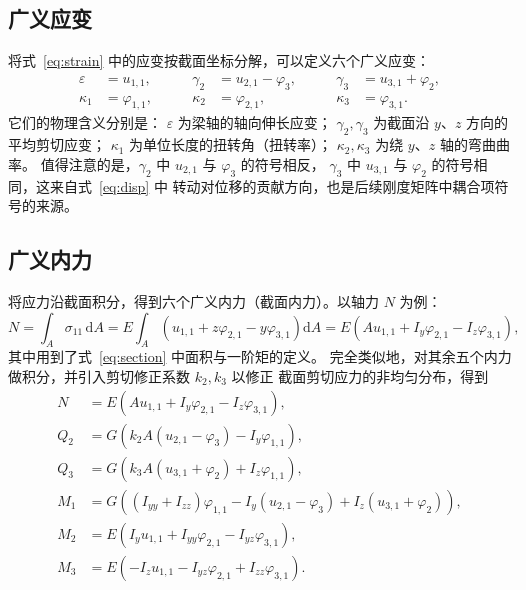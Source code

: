 \documentclass[UTF8,a4paper,11pt]{ctexart}
\newcommand{\ud}{\mathrm{d}}
\begin{document}
\subsection{广义应变}

将式~\eqref{eq:strain} 中的应变按截面坐标分解，可以定义六个广义应变：
\begin{equation}\label{eq:gstrain}
\boxed{
\begin{aligned}
\varepsilon &= u_{1,1}, &\qquad
\gamma_2 &= u_{2,1}-\varphi_3, &\qquad
\gamma_3 &= u_{3,1}+\varphi_2,\\
\kappa_1 &= \varphi_{1,1}, &\qquad
\kappa_2 &= \varphi_{2,1}, &\qquad
\kappa_3 &= \varphi_{3,1}.
\end{aligned}}
\end{equation}
它们的物理含义分别是：
$\varepsilon$ 为梁轴的轴向伸长应变；
$\gamma_2,\gamma_3$ 为截面沿 $y$、$z$ 方向的平均剪切应变；
$\kappa_1$ 为单位长度的扭转角（扭转率）；
$\kappa_2,\kappa_3$ 为绕 $y$、$z$ 轴的弯曲曲率。
值得注意的是，$\gamma_2$ 中 $u_{2,1}$ 与 $\varphi_3$ 的符号相反，
$\gamma_3$ 中 $u_{3,1}$ 与 $\varphi_2$ 的符号相同，这来自式~\eqref{eq:disp} 中
转动对位移的贡献方向，也是后续刚度矩阵中耦合项符号的来源。

\subsection{广义内力}

将应力沿截面积分，得到六个广义内力（截面内力）。以轴力 $N$ 为例：
\begin{equation}
N=\int_A \sigma_{11}\,\ud A
 =E\int_A\left(u_{1,1}+z\varphi_{2,1}-y\varphi_{3,1}\right)\ud A
 =E\left(Au_{1,1}+I_y\varphi_{2,1}-I_z\varphi_{3,1}\right),
\end{equation}
其中用到了式~\eqref{eq:section} 中面积与一阶矩的定义。
完全类似地，对其余五个内力做积分，并引入剪切修正系数 $k_2,k_3$ 以修正
截面剪切应力的非均匀分布，得到
\begin{equation}\label{eq:gforce}
\boxed{
\begin{aligned}
N   &= E\left(Au_{1,1}+I_y\varphi_{2,1}-I_z\varphi_{3,1}\right),\\
Q_2 &= G\left(k_2A\left(u_{2,1}-\varphi_3\right)-I_y\varphi_{1,1}\right),\\
Q_3 &= G\left(k_3A\left(u_{3,1}+\varphi_2\right)+I_z\varphi_{1,1}\right),\\
M_1 &= G\left(\left(I_{yy}+I_{zz}\right)\varphi_{1,1}
      -I_y\left(u_{2,1}-\varphi_3\right)
      +I_z\left(u_{3,1}+\varphi_2\right)\right),\\
M_2 &= E\left(I_yu_{1,1}+I_{yy}\varphi_{2,1}-I_{yz}\varphi_{3,1}\right),\\
M_3 &= E\left(-I_zu_{1,1}-I_{yz}\varphi_{2,1}+I_{zz}\varphi_{3,1}\right).
\end{aligned}}
\end{equation}
\end{document}

